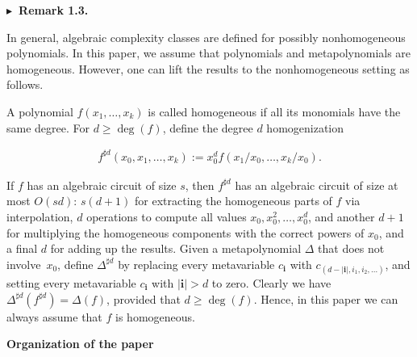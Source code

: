 \par\medskip\noindent\textbf{$\blacktriangleright$ Remark 1.3.}\par



In general, algebraic complexity classes are defined for possibly nonhomogeneous polynomials. In this paper, we assume that polynomials and metapolynomials are homogeneous. However, one can lift the results to the nonhomogeneous setting as follows.





A polynomial $f(x_{1},\ldots,x_{k})$ is called homogeneous if all its monomials have the same degree.
For $d\geq\deg(f)$, define the degree $d$ homogenization



\[\begin{aligned}
f^{\sharp d}(x_{0},x_{1},\ldots,x_{k}):=x_{0}^{d}f(x_{1}/x_{0},\ldots,x_{k}/x_{0}).
\end{aligned}\]


If $f$ has an algebraic circuit of size $s$, then $f^{\sharp d}$ has an algebraic circuit of size at most $O(sd)$:
$s(d+1)$ for extracting the homogeneous parts of $f$ via interpolation,
$d$ operations to compute all values $x_{0},x_{0}^{2},\ldots,x_{0}^{d}$,
and another $d+1$ for multiplying the homogeneous components with the correct powers of $x_{0}$, and a final $d$ for adding up the results.
Given a metapolynomial $\Delta$ that does not involve $x_{0}$,
define $\Delta^{\sharp d}$ by replacing every metavariable $c_{\bm{i}}$ with $c_{(d-|\bm{i}|,i_{1},i_{2},\ldots)}$,
and setting every metavariable $c_{\bm{i}}$ with $|\bm{i}|>d$ to zero.
Clearly we have $\Delta^{\sharp d}(f^{\sharp d})=\Delta(f)$, provided that $d\geq\deg(f)$.
Hence, in this paper we can always assume that $f$ is homogeneous.








\par\medskip\noindent\textbf{Organization of the paper}\par





